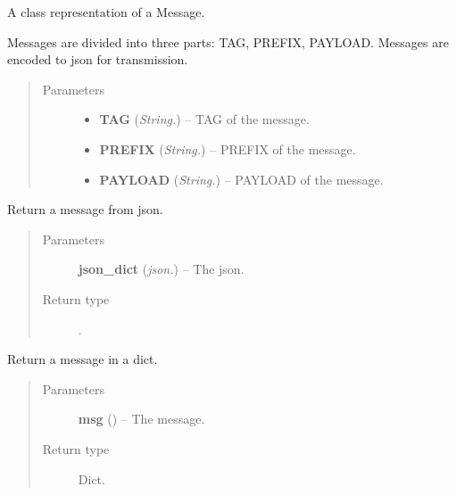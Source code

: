 \documentclass[letterpaper,10pt,english]{sphinxmanual}
\begin{document}
\begin{fulllineitems}
\label{api:swnp.Message}
A class representation of a Message.

Messages are divided into three parts: TAG, PREFIX, PAYLOAD. Messages are encoded to json for transmission.
\begin{quote}\begin{description}
\item[{Parameters}] \leavevmode\begin{itemize}
\item {} 
\textbf{TAG} (\emph{String.}) -- TAG of the message.

\item {} 
\textbf{PREFIX} (\emph{String.}) -- PREFIX of the message.

\item {} 
\textbf{PAYLOAD} (\emph{String.}) -- PAYLOAD of the message.

\end{itemize}

\end{description}\end{quote}

\begin{fulllineitems}
\label{api:swnp.Message.from_json}
Return a message from json.
\begin{quote}\begin{description}
\item[{Parameters}] \leavevmode
\textbf{json\_dict} (\emph{json.}) -- The json.

\item[{Return type}] \leavevmode
{\hyperref[api:swnp.Message]{}}.

\end{description}\end{quote}

\end{fulllineitems}


\begin{fulllineitems}
\label{api:swnp.Message.to_dict}
Return a message in a dict.
\begin{quote}\begin{description}
\item[{Parameters}] \leavevmode
\textbf{msg} ({\hyperref[api:swnp.Message]{}}) -- The message.

\item[{Return type}] \leavevmode
Dict.

\end{description}\end{quote}

\end{fulllineitems}


\end{fulllineitems}
\end{document}

